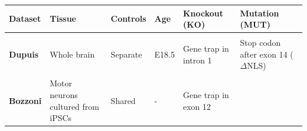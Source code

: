\begin{longtable}[]{@{}llllll@{}}
	\begin{minipage}[t]{0.14\columnwidth}\raggedright\strut
		{\textbf{Dataset}}\strut
	\end{minipage} & \begin{minipage}[t]{0.14\columnwidth}\raggedright\strut
		{\textbf{Tissue}}\strut
	\end{minipage} & \begin{minipage}[t]{0.12\columnwidth}\raggedright\strut
		{\textbf{Controls}}\strut
	\end{minipage} & \begin{minipage}[t]{0.10\columnwidth}\raggedright\strut
		{\textbf{Age}}\strut
	\end{minipage} & \begin{minipage}[t]{0.14\columnwidth}\raggedright\strut
		{\textbf{Knockout (KO)}}\strut
	\end{minipage} & \begin{minipage}[t]{0.14\columnwidth}\raggedright\strut
		{\textbf{Mutation (MUT)}}\strut
	\end{minipage}\tabularnewline\toprule \\[-0.3cm] 
	\begin{minipage}[t]{0.16\columnwidth}\raggedright\strut
		{\textbf{Dupuis}}
		{\footnotesize\citep{Scekic-zahirovic2016}}\strut
	\end{minipage} & \begin{minipage}[t]{0.14\columnwidth}\raggedright\strut
		{Whole brain}\strut
	\end{minipage} & \begin{minipage}[t]{0.12\columnwidth}\raggedright\strut
		{Separate}\strut
	\end{minipage} & \begin{minipage}[t]{0.10\columnwidth}\raggedright\strut
		{E18.5}\strut
	\end{minipage} & \begin{minipage}[t]{0.16\columnwidth}\raggedright\strut
		{Gene trap in intron 1}\strut
	\end{minipage} & \begin{minipage}[t]{0.16\columnwidth}\raggedright\strut
		{Stop codon after exon 14 ($\Delta$NLS)}\strut
	\end{minipage}\tabularnewline \\
	\begin{minipage}[t]{0.16\columnwidth}\raggedright\strut
		{\textbf{Bozzoni}}
		{\footnotesize\citep{Capauto2018}}\strut
	\end{minipage} & \begin{minipage}[t]{0.14\columnwidth}\raggedright\strut
		{Motor neurons}
		{cultured from iPSCs}\strut
	\end{minipage} & \begin{minipage}[t]{0.12\columnwidth}\raggedright\strut
		{Shared}\strut
	\end{minipage} & \begin{minipage}[t]{0.10\columnwidth}\raggedright\strut
		{-}\strut
	\end{minipage} & \begin{minipage}[t]{0.16\columnwidth}\raggedright\strut
		{Gene trap in exon 12}
		

\end{minipage}
\end{longtable}
